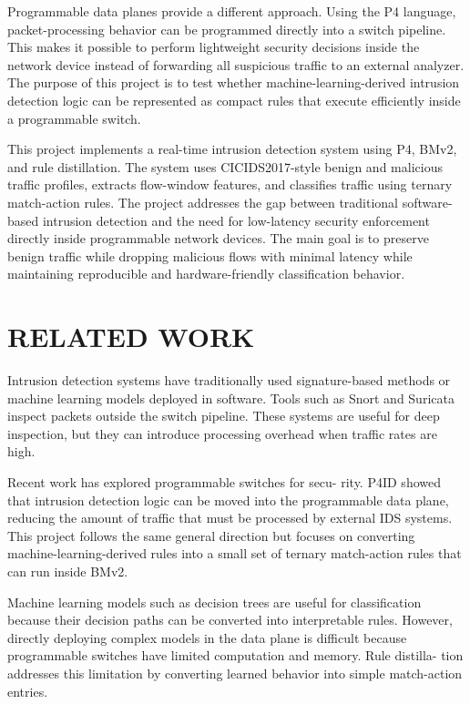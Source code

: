 \documentclass[conference]{IEEEtran}
\begin{document}
Programmable data planes provide a different approach.
Using the P4 language, packet-processing behavior can be
programmed directly into a switch pipeline. This makes it
possible to perform lightweight security decisions inside the
network device instead of forwarding all suspicious traffic to
an external analyzer. The purpose of this project is to test
whether machine-learning-derived intrusion detection logic
can be represented as compact rules that execute efficiently
inside a programmable switch.

This project implements a real-time intrusion detection
system using P4, BMv2, and rule distillation. The system
uses CICIDS2017-style benign and malicious traffic profiles,
extracts flow-window features, and classifies traffic using
ternary match-action rules. The project addresses the gap
between traditional software-based intrusion detection and
the need for low-latency security enforcement directly inside
programmable network devices. The main goal is to preserve
benign traffic while dropping malicious flows with minimal
latency while maintaining reproducible and hardware-friendly
classification behavior.

\section{RELATED WORK}

Intrusion detection systems have traditionally used
signature-based methods or machine learning models
deployed in software. Tools such as Snort and Suricata
inspect packets outside the switch pipeline. These systems are
useful for deep inspection, but they can introduce processing
overhead when traffic rates are high.

Recent work has explored programmable switches for secu-
rity. P4ID showed that intrusion detection logic can be moved
into the programmable data plane, reducing the amount of
traffic that must be processed by external IDS systems. This
project follows the same general direction but focuses on
converting machine-learning-derived rules into a small set of
ternary match-action rules that can run inside BMv2.

Machine learning models such as decision trees are useful
for classification because their decision paths can be converted
into interpretable rules. However, directly deploying complex
models in the data plane is difficult because programmable
switches have limited computation and memory. Rule distilla-
tion addresses this limitation by converting learned behavior
into simple match-action entries.
\end{document}
